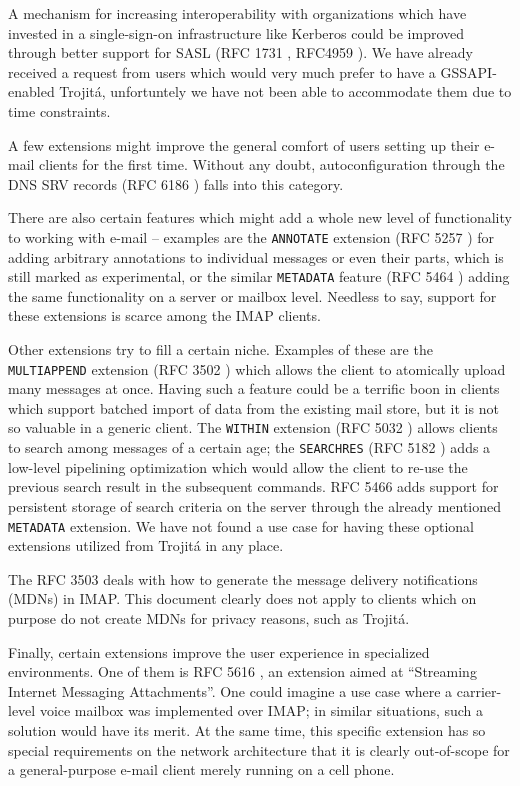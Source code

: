 \documentclass[trojita]{subfiles}
\begin{document}
A mechanism for increasing interoperability with organizations which have invested in a single-sign-on infrastructure
like Kerberos could be improved through better support for SASL (RFC 1731 \cite{rfc1731}, RFC4959 \cite{rfc4959}).  We
have already received a request from users which would very much prefer to have a GSSAPI-enabled Trojitá, unfortuntely
we have not been able to accommodate them due to time constraints.

A few extensions might improve the general comfort of users setting up their e-mail clients for the first time.  Without
any doubt, autoconfiguration through the DNS SRV records (RFC 6186 \cite{rfc6186}) falls into this category.

There are also certain features which might add a whole new level of functionality to working with e-mail -- examples
are the {\tt ANNOTATE} extension (RFC 5257 \cite{rfc5257}) for adding arbitrary annotations to individual messages or
even their parts, which is still marked as experimental, or the similar {\tt METADATA} feature (RFC 5464 \cite{rfc5464})
adding the same functionality on a server or mailbox level.  Needless to say, support for these extensions is scarce
among the IMAP clients.

Other extensions try to fill a certain niche.  Examples of these are the {\tt MULTIAPPEND} extension (RFC 3502
\cite{rfc3502}) which allows the client to atomically upload many messages at once.  Having such a feature could be a
terrific boon in clients which support batched import of data from the existing mail store, but it is not so valuable in
a generic client.  The {\tt WITHIN} extension (RFC 5032 \cite{rfc5032}) allows clients to search among messages of a
certain age; the {\tt SEARCHRES} (RFC 5182 \cite{rfc5182}) adds a low-level pipelining optimization which would allow
the client to re-use the previous search result in the subsequent commands.  RFC 5466 \cite{rfc5466} adds support for
persistent storage of search criteria on the server through the already mentioned {\tt METADATA} extension.  We have not
found a use case for having these optional extensions utilized from Trojitá in any place.

The RFC 3503 \cite{rfc3503} deals with how to generate the message delivery notifications (MDNs) in IMAP.  This document
clearly does not apply to clients which on purpose do not create MDNs for privacy reasons, such as Trojitá.

Finally, certain extensions improve the user experience in specialized environments.  One of them is RFC 5616
\cite{rfc5616}, an extension aimed at ``Streaming Internet Messaging Attachments''.  One could imagine a use case where
a carrier-level voice mailbox was implemented over IMAP; in similar situations, such a solution would have its merit.
At the same time, this specific extension has so special requirements on the network architecture that it is clearly
out-of-scope for a general-purpose e-mail client merely running on a cell phone.
\end{document}
